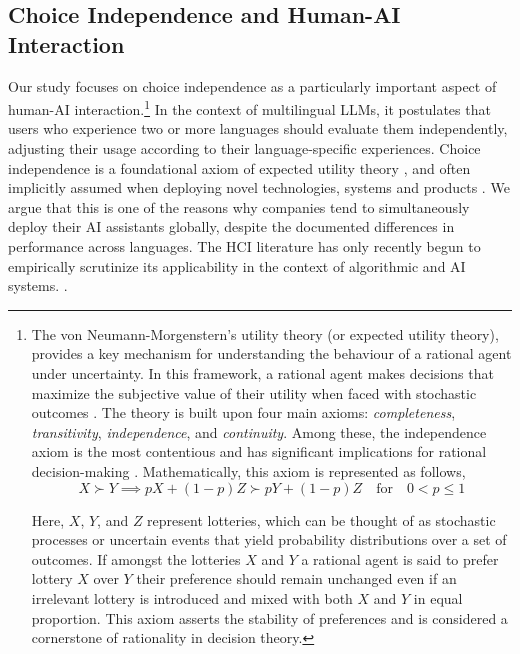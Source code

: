 \subsection{Choice Independence and Human-AI Interaction}
Our study focuses on choice independence as a particularly important aspect of human-AI interaction.\footnote{The von Neumann-Morgenstern's utility theory (or expected utility theory), provides a key mechanism for understanding the behaviour of a rational agent under uncertainty. In this framework, a rational agent makes decisions that maximize the subjective value of their utility when faced with stochastic outcomes \cite{vnm-original}. The theory is built upon four main axioms: \textit{completeness}, \textit{transitivity}, \textit{independence}, and \textit{continuity}. Among these, the independence axiom is the most contentious and has significant implications for rational decision-making \cite{Holt1986-jp}. 
Mathematically, this axiom is represented as follows,
\[
X \succ Y \implies pX + (1-p)Z \succ pY + (1-p)Z \quad \text{for} \quad 0 < p \leq 1
\]

Here, $X$, $Y$, and $Z$ represent lotteries, which can be thought of as stochastic processes or uncertain events that yield probability distributions over a set of outcomes. If amongst the lotteries $X$ and $Y$ a rational agent is said to prefer
lottery $X$ over $Y$ their preference should remain unchanged even if an irrelevant lottery is introduced and mixed with both $X$ and $Y$ in equal proportion. This axiom asserts the stability of preferences and is considered a cornerstone of rationality in decision theory.} 
In the context of multilingual LLMs, it postulates that users who experience two or more languages should evaluate them independently, adjusting their usage according to their language-specific experiences. Choice independence is a foundational axiom of expected utility theory \cite{vnm-original}, and often implicitly assumed when deploying novel technologies, systems and products \cite{erlei2024understanding,Ethayarajh2022-gj}. We argue that this is one of the reasons why companies tend to simultaneously deploy their AI assistants globally, despite the documented differences in performance across languages. The HCI literature has only recently begun to empirically scrutinize its applicability in the context of algorithmic and AI systems. \cite{pareek2024trust,erlei2024understanding}.



